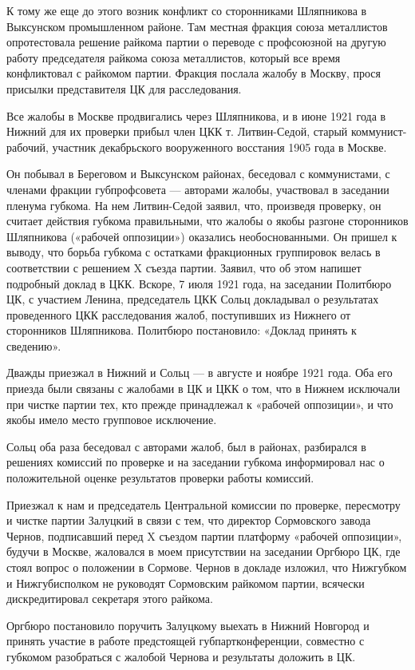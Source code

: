 \documentclass[12pt, a4paper, openany]{book}
\begin{document}
К тому же еще до этого возник конфликт со сторонниками Шляпникова в Выксунском промышленном районе. Там местная фракция союза металлистов опротестовала решение райкома партии о переводе с профсоюзной на другую работу председателя райкома союза металлистов, который все время конфликтовал с райкомом партии. Фракция послала жалобу в Москву, прося присылки представителя ЦК для расследования.

Все жалобы в Москве продвигались через Шляпникова, и в июне 1921 года в Нижний для их проверки прибыл член ЦКК т. Литвин-Седой, старый коммунист-рабочий, участник декабрьского вооруженного восстания 1905 года в Москве.

Он побывал в Береговом и Выксунском районах, беседовал с коммунистами, с членами фракции губпрофсовета — авторами жалобы, участвовал в заседании пленума губкома. На нем Литвин-Седой заявил, что, произведя проверку, он считает действия губкома правильными, что жалобы о якобы разгоне сторонников Шляпникова («рабочей оппозиции») оказались необоснованными. Он пришел к выводу, что борьба губкома с остатками фракционных группировок велась в соответствии с решением X съезда партии. Заявил, что об этом напишет подробный доклад в ЦКК. Вскоре, 7 июля 1921 года, на заседании Политбюро ЦК, с участием Ленина, председатель ЦКК Сольц докладывал о результатах проведенного ЦКК расследования жалоб, поступивших из Нижнего от сторонников Шляпникова. Политбюро постановило: «Доклад принять к сведению».

Дважды приезжал в Нижний и Сольц — в августе и ноябре 1921 года. Оба его приезда были связаны с жалобами в ЦК и ЦКК о том, что в Нижнем исключали при чистке партии тех, кто прежде принадлежал к «рабочей оппозиции», и что якобы имело место групповое исключение.

Сольц оба раза беседовал с авторами жалоб, был в районах, разбирался в решениях комиссий по проверке и на заседании губкома информировал нас о положительной оценке результатов проверки работы комиссий.

Приезжал к нам и председатель Центральной комиссии по проверке, пересмотру и чистке партии Залуцкий в связи с тем, что директор Сормовского завода Чернов, подписавший перед X съездом партии платформу «рабочей оппозиции», будучи в Москве, жаловался в моем присутствии на заседании Оргбюро ЦК, где стоял вопрос о положении в Сормове. Чернов в докладе изложил, что Нижгубком и Нижгубисполком не руководят Сормовским райкомом партии, всячески дискредитировал секретаря этого райкома.

Оргбюро постановило поручить Залуцкому выехать в Нижний Новгород и принять участие в работе предстоящей губпартконференции, совместно с губкомом разобраться с жалобой Чернова и результаты доложить в ЦК.
\end{document}
